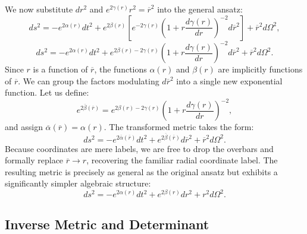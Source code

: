 \documentclass[11pt, a4paper]{report}
\begin{document}
We now substitute $dr^2$ and $e^{2\gamma(r)} r^2 = \overline{r}^2$ into the general ansatz:
\begin{equation}
ds^2 = -e^{2\alpha(r)} dt^2 + e^{2\beta(r)} \left[ e^{-2\gamma(r)} \left( 1 + r \frac{d\gamma(r)}{dr} \right)^{-2} d\overline{r}^2 \right] + \overline{r}^2 d\Omega^2,
\end{equation}
\begin{equation}
ds^2 = -e^{2\alpha(r)} dt^2 + e^{2\beta(r) - 2\gamma(r)} \left( 1 + r \frac{d\gamma(r)}{dr} \right)^{-2} d\overline{r}^2 + \overline{r}^2 d\Omega^2.
\end{equation}
Since $r$ is a function of $\overline{r}$, the functions $\alpha(r)$ and $\beta(r)$ are implicitly functions of $\overline{r}$. We can group the factors modulating $d\overline{r}^2$ into a single new exponential function. Let us define:
\begin{equation}
e^{2\overline{\beta}(\overline{r})} = e^{2\beta(r) - 2\gamma(r)} \left( 1 + r \frac{d\gamma(r)}{dr} \right)^{-2},
\end{equation}
and assign $\overline{\alpha}(\overline{r}) = \alpha(r)$. The transformed metric takes the form:
\begin{equation}
ds^2 = -e^{2\overline{\alpha}(\overline{r})} dt^2 + e^{2\overline{\beta}(\overline{r})} d\overline{r}^2 + \overline{r}^2 d\Omega^2.
\end{equation}
Because coordinates are mere labels, we are free to drop the overbars and formally replace $\overline{r} \rightarrow r$, recovering the familiar radial coordinate label. The resulting metric is precisely as general as the original ansatz but exhibits a significantly simpler algebraic structure:
\begin{equation}
ds^2 = -e^{2\alpha(r)} dt^2 + e^{2\beta(r)} dr^2 + r^2 d\Omega^2.
\end{equation}



\subsection{Inverse Metric and Determinant}
\end{document}
